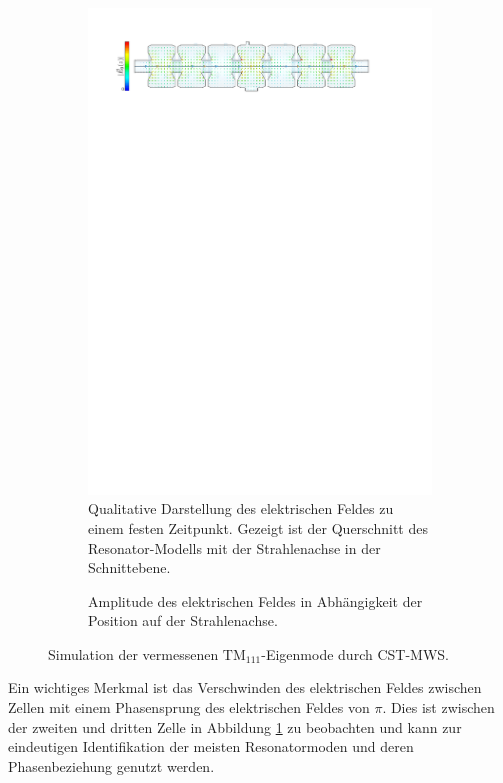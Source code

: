 \begin{figure}[h]
	\centering
	\begin{subfigure}{1\textwidth}
		\centering
		\includegraphics[width=1.0\textwidth]{./figs/TM111-CST/TM111_legende.pdf}
		\caption{Qualitative Darstellung des elektrischen Feldes zu einem festen Zeitpunkt. Gezeigt ist der Querschnitt des Resonator-Modells mit der Strahlenachse in der Schnittebene.}
	\end{subfigure}
	\begin{subfigure}{1\textwidth}
		\centering
		\hspace*{3.5mm}
		\caption{Amplitude des elektrischen Feldes in Abhängigkeit der Position auf der Strahlenachse.}
	\end{subfigure}
	\caption[Simulation der $\mathrm{TM}_{111}$-Eigenmode des PETRA-Resonators durch CST-MWS]{Simulation der vermessenen $\mathrm{TM}_{111}$-Eigenmode durch CST-MWS.}
	\label{fig:cst_sim_tm111}
\end{figure}
Ein wichtiges Merkmal ist das Verschwinden des elektrischen Feldes zwischen Zellen mit einem Phasensprung des elektrischen Feldes von $\pi$.
Dies ist zwischen der zweiten und dritten Zelle in Abbildung \ref{fig:cst_sim_tm111} zu beobachten und kann zur eindeutigen Identifikation der meisten Resonatormoden und deren Phasenbeziehung genutzt werden.

